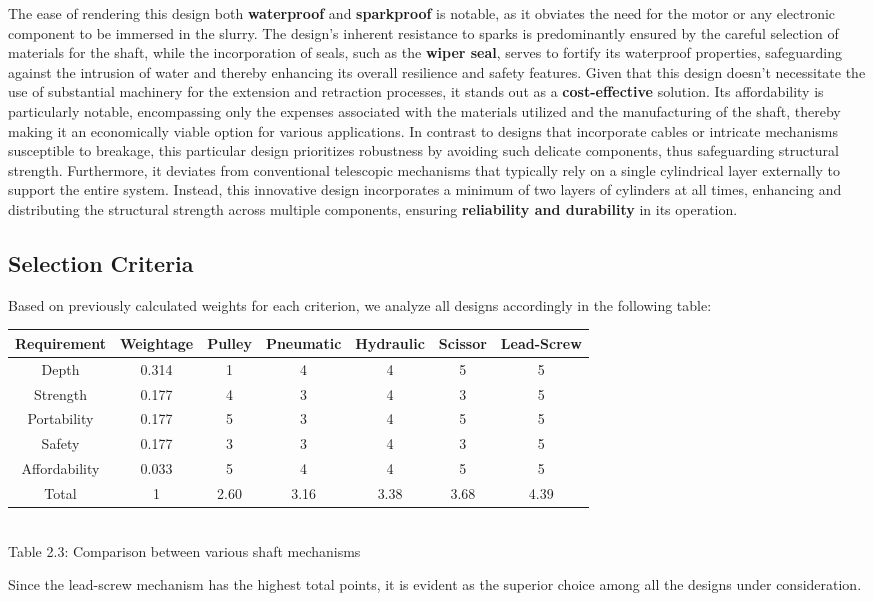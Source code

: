 \documentclass[a4,10pt]{report}
\begin{document}
The ease of rendering this design both \textbf{waterproof} and \textbf{sparkproof} is notable, as it obviates the need for the motor or any electronic component to be immersed in the slurry. The design's inherent resistance to sparks is predominantly ensured by the careful selection of materials for the shaft, while the incorporation of seals, such as the \textbf{wiper seal}, serves to fortify its waterproof properties, safeguarding against the intrusion of water and thereby enhancing its overall resilience and safety features. Given that this design doesn't necessitate the use of substantial machinery for the extension and retraction processes, it stands out as a \textbf{cost-effective} solution. Its affordability is particularly notable, encompassing only the expenses associated with the materials utilized and the manufacturing of the shaft, thereby making it an economically viable option for various applications. In contrast to designs that incorporate cables or intricate mechanisms susceptible to breakage, this particular design prioritizes robustness by avoiding such delicate components, thus safeguarding structural strength. Furthermore, it deviates from conventional telescopic mechanisms that typically rely on a single cylindrical layer externally to support the entire system. Instead, this innovative design incorporates a minimum of two layers of cylinders at all times, enhancing and distributing the structural strength across multiple components, ensuring \textbf{reliability and durability} in its operation.

\subsection{Selection Criteria}
Based on previously calculated weights for each criterion, we analyze all designs accordingly in the following table: \\
\begin{center}
\scriptsize{
    \begin{tabular}{|c|c|c|c|c|c|c|}
        \hline 
        Requirement & Weightage & Pulley & Pneumatic & Hydraulic & Scissor & Lead-Screw \\
        \hline 
        Depth & 0.314 & 1 & 4 & 4 & 5 & 5 \\
        Strength & 0.177 & 4 & 3 & 4 & 3 & 5 \\
        Portability & 0.177 & 5 & 3 & 4 & 5 & 5 \\
        Safety & 0.177 & 3 & 3 & 4 & 3 & 5 \\
        Affordability & 0.033 & 5 & 4 & 4 & 5 & 5 \\
        \hline
        Total & 1 & 2.60 & 3.16 & 3.38 & 3.68 & 4.39 \\
        \hline
    \end{tabular} \\
    \normalsize{Table 2.3: Comparison between various shaft mechanisms} \\
}
\end{center}
Since the lead-screw mechanism has the highest total points, it is evident as the superior choice among all the designs under consideration.
\end{document}
